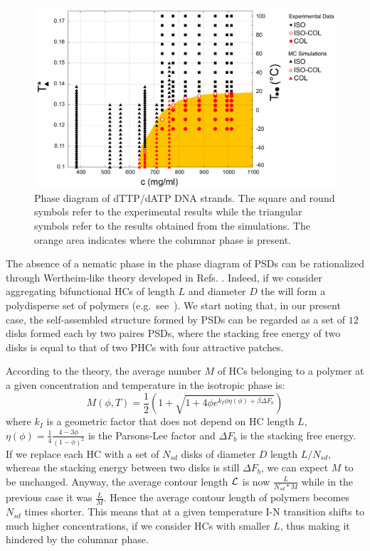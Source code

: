 \documentclass[aip,jcp, amsmath, amssymb, reprint]{revtex4-1}
\begin{document}
\begin{figure}[t!] \includegraphics[width=0.7\linewidth]{finaleeng.png} \caption{\label{fig:wide}Phase diagram of
    dTTP/dATP DNA strands. The square and round symbols refer to the experimental results while the triangular symbols
  refer to the results obtained from the simulations. The orange area indicates where the columnar phase is present.}
\end{figure}



The absence of a nematic phase in the phase diagram of PSDs can be rationalized through Wertheim-like
theory developed in Refs. \cite{Bellini}. Indeed, if we consider aggregating bifunctional HCs of 
length $L$ and diameter $D$ the will form a polydisperse set of polymers (e.g.~see~\cite{DeMichele12}).
We start noting that, in our present case, the self-assembled structure formed by PSDs can be regarded 
as a set of $12$ disks formed each by two paires PSDs, where the stacking free energy of two disks is equal to 
that of two PHCs with four attractive patches.

According to the theory, the average number $M$ of HCs belonging to a polymer at a given concentration 
and temperature in the isotropic phase is:
\begin{equation}
M(\phi, T) = \frac{1}{2}\left( 1 + \sqrt{1 + 4 \phi e^{k_I \phi \eta(\phi)+\beta {\Delta F}_b}} \right) 
\end{equation}
where $k_I$ is a geometric factor that does not depend on HC length $L$, 
$\eta(\phi) = \frac{1}{4} \frac{4-3\phi}{{(1-\phi)}^2}$ is the Parsons-Lee factor
and ${\Delta F}_b$ is the stacking free energy.
If we replace each HC with a set of $N_{sd}$ disks of diameter $D$ length $L/N_{sd}$, whereas the stacking energy between two 
disks is still ${\Delta F}_b$, we can expect $M$ to be unchanged. Anyway, the average contour length ${\cal L}$
is now $\frac{L}{N_{sd}*M}$ while in the previous case it was $\frac{L}{M}$.
Hence the average contour length of polymers becomes $N_{sd}$ times shorter. 
This means that at a given temperature I-N transition shifts to much higher concentrations, if we consider HCs with smaller $L$, 
thus making it hindered by the columnar phase.
\end{document}
